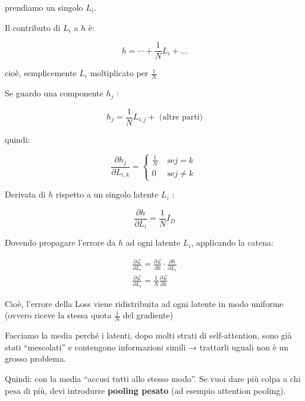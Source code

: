 \documentclass[
  11pt,
]{article}
\begin{document}
prendiamo un singolo \(L_{i}\).

Il contributo di \(L_{i}\) a \(h\) è:

\[h = \cdots + \frac{1}{N}L_{i} + \ldots\]

cioè, semplicemente \(L_{i}\) moltiplicato per \(\frac{1}{N}\)

Se guardo una componente \(h_{j}\) :

\[h_{j} = \frac{1}{N}L_{i,j} + \text{ (altre parti)}\]

quindi:

\[\frac{\partial h_{j}}{\partial L_{i,k}} = \left\{ \begin{matrix}
\frac{1}{N} & \text{ se}j = k \\
0 & \text{ se}j \neq k
\end{matrix} \right.\ \]

Derivata di \(h\) rispetto a un singolo latente \(L_{i}\) :

\[\frac{\partial h}{\partial L_{i}} = \frac{1}{N}I_{D}\]

Dovendo propagare l'errore da \(h\) ad ogni latente \(L_{i}\),
applicando la catena:

\[\begin{matrix}
\frac{\partial\mathcal{L}}{\partial L_{i}} = \frac{\partial\mathcal{L}}{\partial h} \cdot \frac{\partial h}{\partial L_{i}} \\
\frac{\partial\mathcal{L}}{\partial L_{i}} = \frac{1}{N}\frac{\partial\mathcal{L}}{\partial h}
\end{matrix}\]

Cioè, l'errore della Loss viene ridistribuita ad ogni latente in modo
uniforme (ovvero riceve la stessa quota \(\frac{1}{N}\) del gradiente)

Facciamo la media perché i latenti, dopo molti strati di self-attention,
sono già stati ``mescolati'' e contengono informazioni simili →
trattarli uguali non è un grosso problema.

Quindi: con la media ``accusi tutti allo stesso modo''. Se vuoi dare più
colpa a chi pesa di più, devi introdurre \textbf{pooling pesato} (ad
esempio attention pooling).
\end{document}
